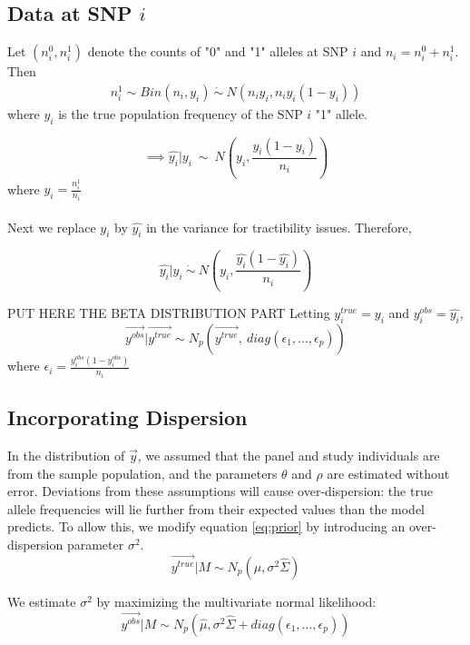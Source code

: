 \documentclass[10pt,a4paper,draft]{article}
\begin{document}
\subsection{Data at SNP $i$}
Let $(n_i^0, n_i^1)$ denote the counts of "0" and "1" alleles at SNP $i$ and $n_i = n_i^0 + n_i^1$. Then 
\begin{align*}
n_i^1 \sim Bin(n_i, y_i) \ \dot{\sim}  \ N(n_iy_i, n_iy_i(1-y_i)) \label{eq:napprox}
\end{align*}
where $y_i$ is the true population frequency of the SNP $i$ "1" allele. 


\begin{equation}
\implies  \hat{y_i} | y_i \ \sim \ N(y_i, \frac{y_i(1-y_i)}{n_i})
\end{equation}
where $\hat{y_i} = \frac{n_i^1}{n_i}$ \\
\\
Next we replace $y_i$ by $\hat{y_i}$ in the variance for tractibility issues. Therefore,

\begin{equation}
\hat{y_i} | y_i \ \dot{\sim} \ N(y_i, \frac{\hat{y_i}(1-\hat{y_i})}{n_i}) \label{bin}
\end{equation}

PUT HERE THE BETA DISTRIBUTION PART
Letting $y^{true}_i = y_i$ and $y^{obs}_i = \hat{y_i}$,
\begin{equation}
\vec{y^{obs}} | \vec{y^{true}} \sim N_p(\vec{y^{true}}, \ diag(\epsilon_1,...,\epsilon_p))
\end{equation}
where $\epsilon_i = \frac{y^{obs}_i (1-y^{obs}_i)}{n_i}$ 

\subsection{Incorporating Dispersion}
In the distribution of $\vec{y}$, we assumed that the panel and study individuals are from the sample population, and the parameters $\theta$ and $\rho$ are estimated without error. Deviations from these assumptions will cause over-dispersion: the true allele frequencies will lie further from their expected values than the model predicts. To allow this, we modify equation \ref{eq:prior} by introducing an over-dispersion parameter $\sigma^2$.
\begin{equation}
\vec{y^{true}}|M \sim N_p(\hat{\mu}, \sigma^2\hat{\Sigma})
\end{equation}

We estimate $\sigma^2$ by maximizing the multivariate normal likelihood:
\begin{equation}
 \vec{y^{obs}}|M \sim N_p(\hat{\mu}, \sigma^2\hat{\Sigma} + diag(\epsilon_1,...,\epsilon_p))
\end{equation}
\end{document}
